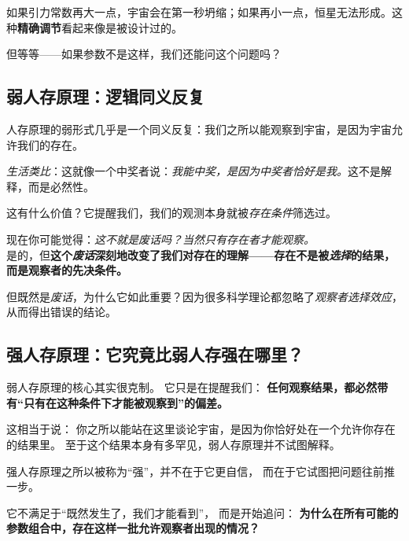\documentclass[openany, a4paper, 12pt]{book}
\begin{document}
	如果引力常数再大一点，宇宙会在第一秒坍缩；如果再小一点，恒星无法形成。这种\textbf{精确调节}看起来像是被设计过的。

	但等等——如果参数不是这样，我们还能问这个问题吗？

	\subsection{弱人存原理：逻辑同义反复}

	人存原理的弱形式几乎是一个同义反复：我们之所以能观察到宇宙，是因为宇宙允许我们的存在。

	\textit{生活类比}：这就像一个中奖者说：\textit{我能中奖，是因为中奖者恰好是我。}这不是解释，而是必然性。

	这有什么价值？它提醒我们，我们的观测本身就被\textit{存在条件}筛选过。

	\begin{tcolorbox}[colback=yellow!5, title=\textit{读者行为预测}]
		现在你可能觉得：\textit{这不就是废话吗？当然只有存在者才能观察。}\\
		是的，但\textbf{这个\textit{废话}深刻地改变了我们对\textbf{存在}的理解——存在不是被\textit{选择}的结果，而是观察者的先决条件。}
	\end{tcolorbox}

	但既然是\textit{废话}，为什么它如此重要？因为很多科学理论都忽略了\textit{观察者选择效应}，从而得出错误的结论。
	
	
\subsection{强人存原理：它究竟比弱人存强在哪里？}

弱人存原理的核心其实很克制。  
它只是在提醒我们：  
\textbf{任何观察结果，都必然带有“只有在这种条件下才能被观察到”的偏差。}

这相当于说：  
你之所以能站在这里谈论宇宙，是因为你恰好处在一个允许你存在的结果里。  
至于这个结果本身有多罕见，弱人存原理并不试图解释。

强人存原理之所以被称为“强”，并不在于它更自信，  
而在于它试图把问题往前推一步。

它不满足于“既然发生了，我们才能看到”，  
而是开始追问：  
\textbf{为什么在所有可能的参数组合中，存在这样一批允许观察者出现的情况？}
\end{document}
